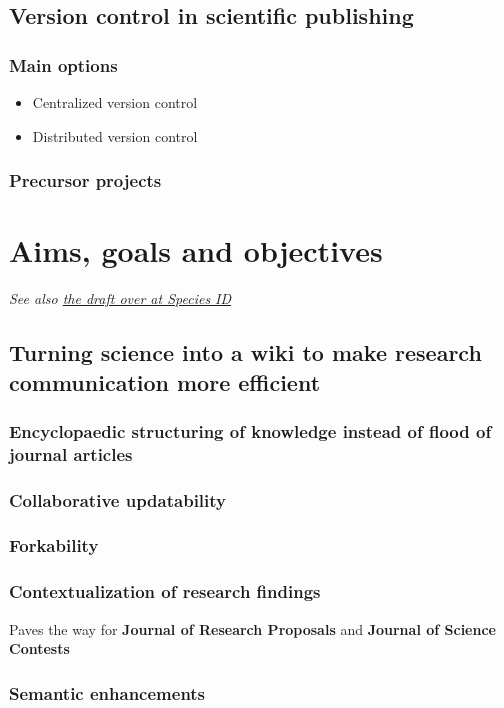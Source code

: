\documentclass[final,authoryear,3p]{elsarticle-open-drafting}
\begin{document}
\subsection{Version control in scientific publishing}
\subsubsection{Main options}
\begin{itemize}
	\item Centralized version control
	\item Distributed version control
\end{itemize}
	
\subsubsection{Precursor projects}

\section{Aims, goals and objectives}
{\it See also \href{http://species-id.net/wiki/Draft:Encyclopaedia_of_original_research#Aims,_Goals_and_Objectives}{the draft over at Species ID}}

\subsection{Turning science into a wiki to make research communication more efficient}
\subsubsection{Encyclopaedic structuring of knowledge instead of flood of journal articles}
\subsubsection{Collaborative updatability}
\subsubsection{Forkability}
\subsubsection{Contextualization of research findings}
Paves the way for {\bf Journal of Research Proposals} and {\bf Journal of Science Contests}

\subsubsection{Semantic enhancements}
\end{document}
